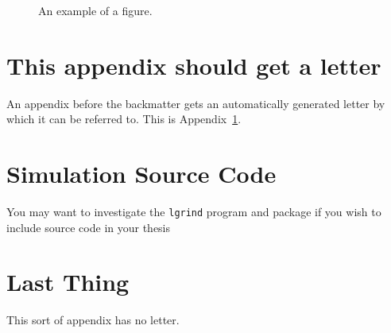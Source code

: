 \documentclass[a4paper,11pt,phdthesis,singlespace,twoside]{cssethesis}
\begin{document}
\begin{figure}[ht]
\begin{center}
\end{center}
\caption{An example of a figure.}
\label{fig:example}
\end{figure}

\appendix %

\chapter{This appendix should get a letter}
\label{app:example}
An appendix before the backmatter gets an automatically generated letter by
which it can be referred to. This is Appendix~\ref{app:example}.

\chapter{Simulation Source Code}
You may want to investigate the \texttt{lgrind} program and package if you
wish to include source code in your thesis


\backmatter						%



\chapter{Last Thing} 
This sort of appendix has no letter. 
\end{document}
